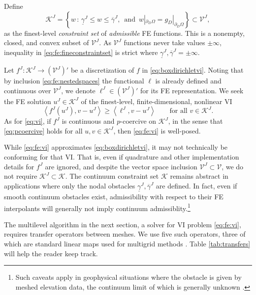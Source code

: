 \documentclass[letterpaper,final,12pt,reqno]{amsart}
\theoremstyle{cstyle}
\theoremstyle{cstyle*}
\theoremstyle{dstyle}
\numberwithin{equation}{section}
\numberwithin{figure}{section}
\numberwithin{table}{section}
\numberwithin{theorem}{section}
\newcommand{\cK}{\mathcal{K}}
\newcommand{\ip}[2]{\left<#1,#2\right>}
\begin{document}
Define
\begin{equation}
\mathcal{K}^J = \left\{w\,:\,\underline{\gamma}^J \le w \le \overline{\gamma}^J, \, \text{ and } \, w|_{\partial_D\Omega} = g_D|_{\partial_D\Omega}\right\} \subset \mathcal{V}^J, \label{eq:fe:fineconstraintset}
\end{equation}
as the finest-level \emph{constraint set} of \emph{admissible} FE functions.  This is a nonempty, closed, and convex subset of $\mathcal{V}^J$.  As $\mathcal{V}^J$ functions never take values $\pm\infty$, inequality in \eqref{eq:fe:fineconstraintset} is strict where $\underline{\gamma}^J, \overline{\gamma}^J = \pm \infty$.

Let $f^J:\mathcal{K}^J \to (\mathcal{V}^J)'$ be a discretization of $f$ in \eqref{eq:boxdirichletvi}.  Noting that by inclusion \eqref{eq:fe:nestedspaces} the functional $\ell$ is already defined and continuous over $\mathcal{V}^J$, we denote $\ell^J \in (\mathcal{V}^J)'$ for its FE representation.  We seek the FE solution $u^J \in \mathcal{K}^J$ of the finest-level, finite-dimensional, nonlinear VI
\begin{equation}
\ip{f^J(u^J)}{v-u^J} \ge \ip{\ell^J}{v-u^J} \qquad \text{for all } v\in \cK^J. \label{eq:fe:vi}
\end{equation}
As for \eqref{eq:vi}, if $f^J$ is continuous and $p$-coercive on $\mathcal{K}^J$, in the sense that \eqref{eq:pcoercive} holds for all $u,v \in \mathcal{K}^J$, then \eqref{eq:fe:vi} is well-posed.

While \eqref{eq:fe:vi} approximates \eqref{eq:boxdirichletvi}, it may not technically be conforming for that VI.  That is, even if quadrature and other implementation details for $f^J$ are ignored, and despite the vector space inclusion $\mathcal{V}^J \subset \mathcal{V}$, we do not require $\mathcal{K}^J \subset \mathcal{K}$.  The continuum constraint set $\mathcal{K}$ remains abstract in applications where only the nodal obstacles $\underline{\gamma}^J, \overline{\gamma}^J$ are defined.  In fact, even if smooth continuum obstacles exist, admissibility with respect to their FE interpolants will generally not imply continuum admissiblity.\footnote{Such caveats apply in geophysical situations where the obstacle is given by meshed elevation data, the continuum limit of which is generally unknown \cite{Bueler2016}.}

The multilevel algorithm in the next section, a solver for VI problem \eqref{eq:fe:vi}, requires transfer operators between meshes.  We use five such operators, three of which are standard linear maps used for multigrid methods \cite{Trottenbergetal2001}.  Table \ref{tab:transfers} will help the reader keep track.
\end{document}
